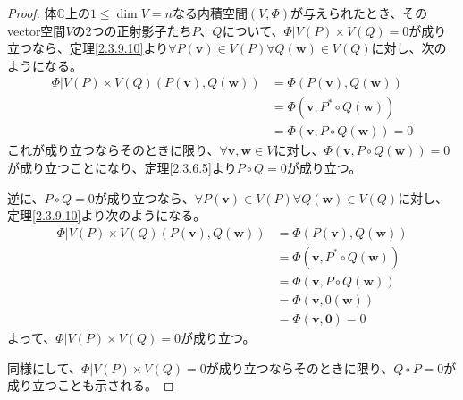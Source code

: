 \documentclass[dvipdfmx]{jsarticle}
\begin{document}
\begin{proof}
体$\mathbb{C}$上の$1 \leq \dim V = n$なる内積空間$(V,\varPhi)$が与えられたとき、そのvector空間$V$の2つの正射影子たち$P$、$Q$について、$\varPhi|V(P) \times V(Q) = 0$が成り立つなら、定理\ref{2.3.9.10}より$\forall P\left( \mathbf{v} \right) \in V(P)\forall Q\left( \mathbf{w} \right) \in V(Q)$に対し、次のようになる。
\begin{align*}
\varPhi|V(P) \times V(Q)\left( P\left( \mathbf{v} \right),Q\left( \mathbf{w} \right) \right) &= \varPhi\left( P\left( \mathbf{v} \right),Q\left( \mathbf{w} \right) \right)\\
&= \varPhi\left( \mathbf{v},P^{*} \circ Q\left( \mathbf{w} \right) \right)\\
&= \varPhi\left( \mathbf{v},P \circ Q\left( \mathbf{w} \right) \right) = 0
\end{align*}
これが成り立つならそのときに限り、$\forall\mathbf{v},\mathbf{w} \in V$に対し、$\varPhi\left( \mathbf{v},P \circ Q\left( \mathbf{w} \right) \right) = 0$が成り立つことになり、定理\ref{2.3.6.5}より$P \circ Q = 0$が成り立つ。\par
逆に、$P \circ Q = 0$が成り立つなら、$\forall P\left( \mathbf{v} \right) \in V(P)\forall Q\left( \mathbf{w} \right) \in V(Q)$に対し、定理\ref{2.3.9.10}より次のようになる。
\begin{align*}
\varPhi|V(P) \times V(Q)\left( P\left( \mathbf{v} \right),Q\left( \mathbf{w} \right) \right) &= \varPhi\left( P\left( \mathbf{v} \right),Q\left( \mathbf{w} \right) \right)\\
&= \varPhi\left( \mathbf{v},P^{*} \circ Q\left( \mathbf{w} \right) \right)\\
&= \varPhi\left( \mathbf{v},P \circ Q\left( \mathbf{w} \right) \right)\\
&= \varPhi\left( \mathbf{v},0\left( \mathbf{w} \right) \right)\\
&= \varPhi\left( \mathbf{v},\mathbf{0} \right) = 0
\end{align*}
よって、$\varPhi|V(P) \times V(Q) = 0$が成り立つ。\par
同様にして、$\varPhi|V(P) \times V(Q) = 0$が成り立つならそのときに限り、$Q \circ P = 0$が成り立つことも示される。
\end{proof}
\end{document}
